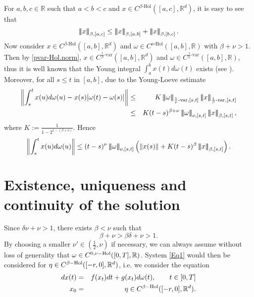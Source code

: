 \documentclass[graybox]{svmult}
\newcommand{\R}{\ensuremath{\mathbb{R}}}
\newcommand{\ltn}{\ensuremath{\left| \! \left| \! \left|}}
\newcommand{\rtn}{\ensuremath{\right| \! \right| \! \right|}}
\begin{document}
For $a,b,c\in\R$ such that $a<b<c$ and $x \in C^{\beta\text{-Hol}}([a,c],\R^d)$,  it is easy to see that 
$$
\ltn x\rtn_{\beta,[a,c]} \leq \ltn x\rtn_{\beta,[a,b]}+\ltn x\rtn_{\beta,[b,c]}.
$$
Now consider $x \in C^{\beta\text{-Hol}}([a,b],\R^d)$ and $\omega \in C^{\nu\text{-Hol}}([a,b],\R)$ with $\beta+\nu>1$. Then by \eqref{pvar-Hol.norm}, $x \in C^{\frac{1}{\beta}\text{-var}}([a,b],\R^d)$ and $\omega \in C^{\frac{1}{\nu}\text{-var}}([a,b],\R)$, thus it is well known that the Young integral $\int_a^bx(t)d\omega(t)$ exists (see \cite[p.\ 264-265]{friz}). Moreover, for all $s\leq t$ in $[a,b]$, due to the Young-Loeve estimate \cite[Theorem 6.8, p.~116]{friz}
\begin{eqnarray*}
	\left\|\int_s^tx(u)d\omega(u) - x(s)[\omega(t)-\omega(s)]\right\| &\leq& K \ltn \omega \rtn_{\frac{1}{\nu}\text{-var},[s,t]} \ltn x \rtn_{\frac{1}{\beta}\text{-var},[s,t]} \\
	&\leq& K (t-s)^{\beta+\nu}\ltn \omega \rtn_{\nu,[s,t]} \ltn x \rtn_{\beta,[s,t]},
\end{eqnarray*}
where $K:= \frac{1}{1-2^{1-(\beta+\nu)}}$. Hence
\begin{equation}
\left\|\int_s^tx(u)d\omega(u)\right\| \leq (t-s)^\nu\ltn\omega\rtn_{\nu,[s,t]} \left(\|x(s)\|+K(t-s)^{\beta}\ltn x\rtn_{\beta,[s,t]} \right).
\end{equation}

\section{Existence, uniqueness and continuity of the solution}

Since $\delta \nu + \nu >1$, there exists $\beta < \nu$ such that
\[
\beta+\nu > \beta\delta +\nu>1.
\]
By choosing a smaller $\nu' \in (\frac{1}{2},\nu)$ if necessary, we can always assume without loss of generality that $\omega\in C^{0,\nu\rm{-Hol}}([0,T],\R)$. System \eqref{Eq1} would then be considered for $\eta \in C^{\beta\rm{-Hol}}([-r,0],\R^d)$, i.e. we consider the equation 
\begin{eqnarray}\label{Eq2}
dx(t)&=&f(x_t)dt+g(x_t)d\omega(t), \qquad t\in [0,T]\\
x_0&=&\eta\in C^{\beta\rm{-Hol}}([-r,0],\R^d). \notag
\end{eqnarray}
\end{document}
